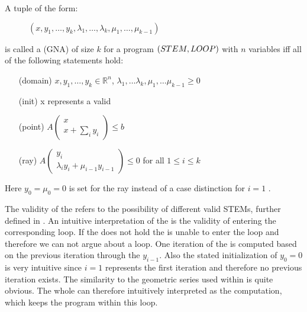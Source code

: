 \begin{definition}
	\label{def:gna}
	A tuple of the form:
	\begin{figure}[H]
		\centering
		$(x, y_1, \dots, y_k, \lambda_1, \dots, \lambda_k, \mu_1, \dots, \mu_{k-1})$
	\end{figure}  
	\vspace{-1em}
	is called a \gna (GNA) of size $k$ for a program $(STEM, LOOP)$ with $n$ variables iff all of the following statements hold:
	\begin{itemize}
		\setlength{\itemindent}{1in}
		\item[(domain)] $x, y_1, \dots, y_k \in \mathbb{R}^n$, $\lambda_1, \dots \lambda_k, \mu_1, \dots \mu_{k-1} \ge 0$
		\item[(init)] x represents a valid \stem
		\item[(point)] $A\begin{pmatrix} x \\ x + \sum_i y_i \end{pmatrix} \le b$
		\item[(ray)] $A\begin{pmatrix} y_i \\ \lambda_i y_i + \mu_{i-1} y_{i-1} \end{pmatrix} \le 0$ for all $1 \le i \le k$
	\end{itemize}
	Here $y_0 = \mu_0 = 0$ is set for the ray instead of a case distinction for $i=1$ \cite{leike2014geometric}.
\end{definition}
The validity of the \initc refers to the possibility of different valid STEMs, further defined in .
An intuitive interpretation of the \pointc is the validity of entering the corresponding loop. If the \pointc does not hold the \its is unable to enter the loop and therefore we can not argue about a \nonterm loop. One iteration of the \rayc is computed based on the previous iteration through the $y_{i-1}$. Also the stated initialization of $y_0=0$ is very intuitive since $i=1$ represents the first iteration and therefore no previous iteration exists. The similarity to the geometric series used within \cite{leike2014geometric} is quite obvious. The whole \rayc can therefore intuitively interpreted as the computation, which keeps the program within this loop. 
